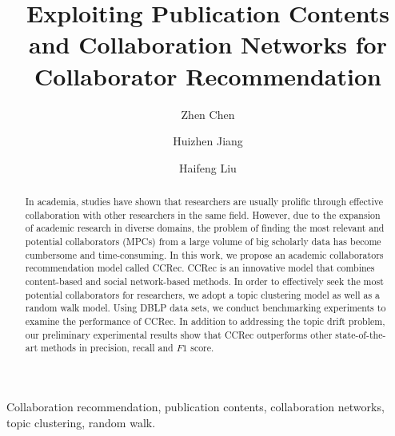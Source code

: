 \documentclass[review]{elsarticle}
\begin{document}
\begin{frontmatter}

\title{Exploiting Publication Contents and Collaboration Networks for Collaborator Recommendation}



%

\author[mymainaddress]{Zhen Chen}
\author[mymainaddress]{Huizhen Jiang}
\author[mymainaddress]{Haifeng Liu}
\address[mymainaddress]{Dalian University of Technology, Dalian, China}
\begin{abstract}
In academia, studies have shown that researchers are usually prolific through effective collaboration with other researchers in the same field. However, due to the expansion of academic research in diverse domains, the problem of finding the most relevant and potential collaborators (MPCs) from a large volume of big scholarly data has become cumbersome and time-consuming. In this work, we propose an academic collaborators recommendation model called CCRec. CCRec is an innovative model that combines content-based and social network-based methods. In order to effectively seek the most potential collaborators for researchers, we adopt a topic clustering model as well as a random walk model. Using DBLP data sets, we conduct benchmarking experiments to examine the performance of CCRec. In addition to addressing the topic drift problem, our preliminary experimental results show that CCRec outperforms other state-of-the-art methods in precision, recall and $F1$ score.
\end{abstract}

\begin{keyword}
Collaboration recommendation, publication contents, collaboration networks, topic clustering, random walk.
\end{keyword}

\end{frontmatter}
\end{document}
